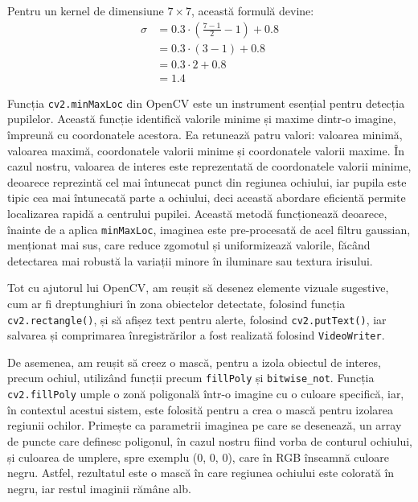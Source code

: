 \documentclass[12pt,a4paper]{article}
\begin{document}
\hspace{-6mm}Pentru un kernel de dimensiune \(7 \times 7\), această formulă devine:
\begin{align}
\sigma &= 0.3 \cdot \left( \frac{7 - 1}{2} - 1 \right) + 0.8 \nonumber \\
    &= 0.3 \cdot (3 - 1) + 0.8 \nonumber \\
    &= 0.3 \cdot 2 + 0.8 \nonumber \\
    &= 1.4
\end{align}

Funcția \texttt{cv2.minMaxLoc} din OpenCV este un instrument esențial pentru
detecția pupilelor. Această funcție identifică valorile minime și maxime
dintr-o imagine, împreună cu coordonatele acestora. Ea retunează patru
valori: valoarea minimă, valoarea maximă, coordonatele valorii minime și
coordonatele valorii maxime. În cazul nostru, valoarea de interes este
reprezentată de coordonatele valorii minime, deoarece reprezintă cel mai
întunecat punct din regiunea ochiului, iar pupila este tipic cea mai
întunecată parte a ochiului, deci această abordare eficientă permite
localizarea rapidă a centrului pupilei. Această metodă funcționează
deoarece, înainte de a aplica \texttt{minMaxLoc}, imaginea este pre-procesată de
acel filtru gaussian, menționat mai sus, care reduce zgomotul și
uniformizează valorile, făcând detectarea mai robustă la variații minore
în iluminare sau textura irisului.

Tot cu ajutorul lui OpenCV, am reușit să desenez elemente vizuale
sugestive, cum ar fi dreptunghiuri în zona obiectelor detectate,
folosind funcția \texttt{cv2.rectangle()}, și să afișez text pentru alerte,
folosind \texttt{cv2.putText()}, iar salvarea și comprimarea înregistrărilor a
fost realizată folosind \texttt{VideoWriter}.

De asemenea, am reușit să creez o mască, pentru a izola obiectul de
interes, precum ochiul, utilizând funcții precum \texttt{fillPoly} și
\texttt{bitwise\_not}. Funcția \texttt{cv2.fillPoly} umple o zonă poligonală într-o imagine
cu o culoare specifică, iar, în contextul acestui sistem, este folosită
pentru a crea o mască pentru izolarea regiunii ochilor. Primește ca
parametrii imaginea pe care se desenează, un array de puncte care
definesc poligonul, în cazul nostru fiind vorba de conturul ochiului, și
culoarea de umplere, spre exemplu (0, 0, 0), care în RGB înseamnă
culoare negru. Astfel, rezultatul este o mască în care regiunea ochiului
este colorată în negru, iar restul imaginii rămâne alb.
\end{document}

